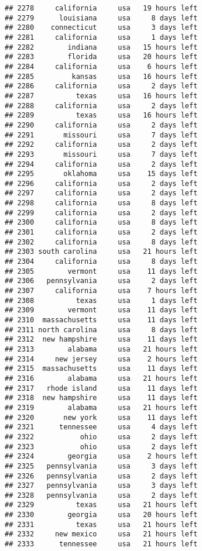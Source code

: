 \documentclass[
]{article}
\begin{document}
\begin{verbatim}
## 2278     california     usa   19 hours left
## 2279      louisiana     usa     8 days left
## 2280    connecticut     usa     3 days left
## 2281     california     usa     1 days left
## 2282        indiana     usa   15 hours left
## 2283        florida     usa   20 hours left
## 2284     california     usa    6 hours left
## 2285         kansas     usa   16 hours left
## 2286     california     usa     2 days left
## 2287          texas     usa   16 hours left
## 2288     california     usa     2 days left
## 2289          texas     usa   16 hours left
## 2290     california     usa     2 days left
## 2291       missouri     usa     7 days left
## 2292     california     usa     2 days left
## 2293       missouri     usa     7 days left
## 2294     california     usa     2 days left
## 2295       oklahoma     usa    15 days left
## 2296     california     usa     2 days left
## 2297     california     usa     2 days left
## 2298     california     usa     8 days left
## 2299     california     usa     2 days left
## 2300     california     usa     8 days left
## 2301     california     usa     2 days left
## 2302     california     usa     8 days left
## 2303 south carolina     usa   21 hours left
## 2304     california     usa     8 days left
## 2305        vermont     usa    11 days left
## 2306   pennsylvania     usa     2 days left
## 2307     california     usa    7 hours left
## 2308          texas     usa     1 days left
## 2309        vermont     usa    11 days left
## 2310  massachusetts     usa    11 days left
## 2311 north carolina     usa     8 days left
## 2312  new hampshire     usa    11 days left
## 2313        alabama     usa   21 hours left
## 2314     new jersey     usa    2 hours left
## 2315  massachusetts     usa    11 days left
## 2316        alabama     usa   21 hours left
## 2317   rhode island     usa    11 days left
## 2318  new hampshire     usa    11 days left
## 2319        alabama     usa   21 hours left
## 2320       new york     usa    11 days left
## 2321      tennessee     usa     4 days left
## 2322           ohio     usa     2 days left
## 2323           ohio     usa     2 days left
## 2324        georgia     usa    2 hours left
## 2325   pennsylvania     usa     3 days left
## 2326   pennsylvania     usa     2 days left
## 2327   pennsylvania     usa     3 days left
## 2328   pennsylvania     usa     2 days left
## 2329          texas     usa   21 hours left
## 2330        georgia     usa   20 hours left
## 2331          texas     usa   21 hours left
## 2332     new mexico     usa   21 hours left
## 2333      tennessee     usa   21 hours left

\end{verbatim}
\end{document}

